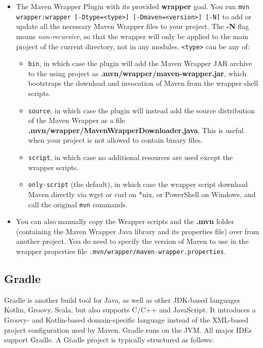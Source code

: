 \documentclass[table, xcdraw]{article}%
\begin{document}
\begin{itemize}
    \item The Maven Wrapper Plugin with its provided \textbf{wrapper} goal. You run \texttt{mvn wrapper:wrapper [-Dtype=<type>] [-Dmaven=<version>] [-N]} to add or update all the necessary Maven Wrapper files to your project. The \textbf{-N} flag means \emph{non-recursive}, so that the wrapper will only be applied to the main project of the current directory, not in any modules. \texttt{<type>} can be any of:
    \begin{itemize}
        \item \texttt{bin}, in which case the plugin will add the Maven Wrapper JAR archive to the using project as \textbf{.mvn/wrapper/maven-wrapper.jar}, which bootstraps the download and invocation of Maven from the wrapper shell scripts.
        \item \texttt{source}, in which case the plugin will instead add the source distribution of the Maven Wrapper as a file \textbf{.mvn/wrapper/MavenWrapperDownloader.java}. This is useful when your project is not allowed to contain binary files.
        \item \texttt{script}, in which case no additional resources are used except the wrapper scripts.
        \item \texttt{only-script} (the default), in which case the wrapper script download Maven directly via wget or curl on *nix, or PowerShell on Windows, and call the original \texttt{mvn} commands.
    \end{itemize}
    \item You can also manually copy the Wrapper scripts and the \textbf{.mvn} folder (containing the Maven Wrapper Java library and its properties file) over from another project. You do need to specify the version of Maven to use in the wrapper properties file \texttt{.mvn/wrapper/maven-wrapper.properties}.
\end{itemize}

\subsection{Gradle}

Gradle is another build tool for Java, as well as other JDK-based languages Kotlin, Groovy, Scala, but also supports C/C++ and JavaScript. It introduces a Groovy- and Kotlin-based domain-specific language instead of the XML-based project configuration used by Maven. Gradle runs on the JVM. All major IDEs support Gradle. A Gradle project is typically structured as follows:
\end{document}
